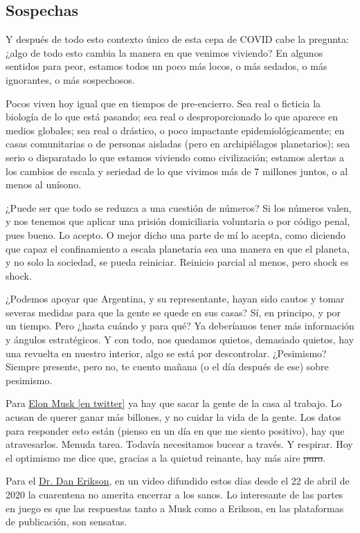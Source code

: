 \subsection{Sospechas}

Y después de todo esto contexto único de esta cepa de COVID cabe la pregunta: 
¿algo de todo esto cambia la manera en que venimos viviendo? 
En algunos sentidos para peor, estamos todos un poco más locos, o más sedados, o más ignorantes, o más sospechosos.

Pocos viven hoy igual que en tiempos de pre-encierro. 
Sea real o ficticia la biología de lo que está pasando;
sea real o desproporcionado lo que aparece en medios globales; 
sea real o drástico, o poco impactante epidemiológicamente; 
en casas comunitarias o de personas aisladas (pero en archipiélagos planetarios); 
sea serio o disparatado lo que estamos viviendo como civilización;
estamos alertas a los cambios de escala y seriedad de lo que vivimos más de 7 millones juntos, 
o al menos al unísono.

¿Puede ser que todo se reduzca a una cuestión de números? Si los números
valen, y nos tenemos que aplicar una prisión domiciliaria voluntaria o
por código penal, pues bueno. Lo acepto. O mejor dicho una parte de mí
lo acepta, como diciendo que capaz el confinamiento a escala planetaria
sea una manera en que el planeta, y no solo la sociedad, se pueda
reiniciar. Reinicio parcial al menos, pero shock es shock.

¿Podemos apoyar que Argentina, y su representante, hayan sido cautos y
tomar severas medidas para que la gente se quede en sus casas? Sí, en
principo, y por un tiempo. Pero ¿hasta cuándo y para qué? Ya deberíamos
tener más información y ángulos estratégicos. Y con todo, nos quedamos
quietos, demasiado quietos, hay una revuelta en nuestro interior, algo
se está por descontrolar. ¿Pesimismo? Siempre presente, pero no, te
cuento mañana (o el día después de ese) sobre pesimismo.

Para \href{https://twitter.com/elonmusk/status/1255380013488189440}{Elon
Musk [en twitter]} ya hay que sacar la gente de la casa al trabajo.
Lo acusan de querer ganar más billones, y no cuidar la vida de la gente. 
Los datos para responder esto están (pienso en un día en que me siento positivo), hay que atravesarlos. Menuda tarea. 
Todavía necesitamos bucear a través. Y respirar. 
Hoy el optimismo me dice que, gracias a la quietud reinante, hay más aire\sout{ puro}.

Para el \href{https://www.youtube.com/watch?v=_F_bgOEMFQg\&feature=youtu.be}{Dr. Dan Erikson}, en un video difundido estos días desde el 22 de abril de 2020
la cuarentena no amerita encerrar a los sanos. 
Lo interesante de las partes en juego es que las respuestas tanto a Musk como a Erikson, en las plataformas de publicación, son sensatas. 
